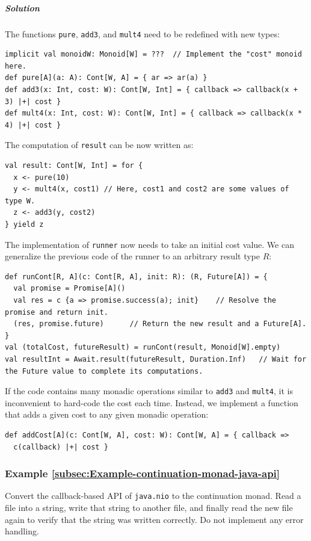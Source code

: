 \subparagraph{Solution}

The functions \lstinline!pure!, \lstinline!add3!, and \lstinline!mult4!
need to be redefined with new types:
\begin{lstlisting}
implicit val monoidW: Monoid[W] = ???  // Implement the "cost" monoid here.
def pure[A](a: A): Cont[W, A] = { ar => ar(a) }
def add3(x: Int, cost: W): Cont[W, Int] = { callback => callback(x + 3) |+| cost }
def mult4(x: Int, cost: W): Cont[W, Int] = { callback => callback(x * 4) |+| cost }
\end{lstlisting}
The computation of \lstinline!result! can be now written as:
\begin{lstlisting}
val result: Cont[W, Int] = for {
  x <- pure(10)
  y <- mult4(x, cost1) // Here, cost1 and cost2 are some values of type W.
  z <- add3(y, cost2)
} yield z
\end{lstlisting}
The implementation of \lstinline!runner! now needs to take an initial
cost value. We can generalize the previous code of the runner to an
arbitrary result type $R$:
\begin{lstlisting}
def runCont[R, A](c: Cont[R, A], init: R): (R, Future[A]) = {
  val promise = Promise[A]()
  val res = c {a => promise.success(a); init}    // Resolve the promise and return init.
  (res, promise.future)      // Return the new result and a Future[A].
}
val (totalCost, futureResult) = runCont(result, Monoid[W].empty)
val resultInt = Await.result(futureResult, Duration.Inf)   // Wait for the Future value to complete its computations.
\end{lstlisting}

If the code contains many monadic operations similar to \lstinline!add3!
and \lstinline!mult4!, it is inconvenient to hard-code the cost each
time. Instead, we  implement a function that adds a given cost to
any given monadic operation:
\begin{lstlisting}
def addCost[A](c: Cont[W, A], cost: W): Cont[W, A] = { callback =>
  c(callback) |+| cost }
\end{lstlisting}


\subsubsection{Example \label{subsec:Example-continuation-monad-java-api}\ref{subsec:Example-continuation-monad-java-api}}

Convert the callback-based API of \lstinline!java.nio! to the continuation
monad. Read a file into a string, write that string to another file,
and finally read the new file again to verify that the string was
written correctly. Do not implement any error handling.

